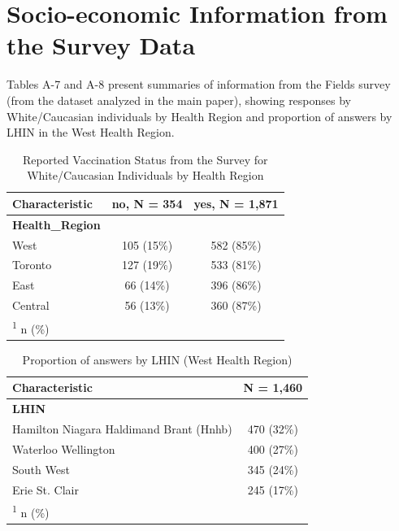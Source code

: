 \documentclass[
  letterpaper,
  DIV=11,
  numbers=noendperiod]{scrartcl}
\begin{document}
\hypertarget{socio-economic-information-from-the-survey-data}{%
\section{Socio-economic Information from the Survey
Data}\label{socio-economic-information-from-the-survey-data}}

Tables A-7 and A-8 present summaries of information from the Fields
survey (from the dataset analyzed in the main paper), showing responses
by White/Caucasian individuals by Health Region and proportion of
answers by LHIN in the West Health Region.

\hypertarget{tbl-hr-percentages}{}
\begin{table}
\caption{\label{tbl-hr-percentages}Reported Vaccination Status from the Survey for White/Caucasian
Individuals by Health Region }\tabularnewline

\centering
\begin{tabular}{lcc}
\toprule
\textbf{Characteristic} & \textbf{no}, N = 354 & \textbf{yes}, N = 1,871\\
\midrule
\textbf{Health\_Region} &  & \\
\hspace{1em}West & 105 (15\%) & 582 (85\%)\\
\hspace{1em}Toronto & 127 (19\%) & 533 (81\%)\\
\hspace{1em}East & 66 (14\%) & 396 (86\%)\\
\hspace{1em}Central & 56 (13\%) & 360 (87\%)\\
\bottomrule
\multicolumn{3}{l}{\rule{0pt}{1em}\textsuperscript{1} n (\%)}\\
\end{tabular}
\end{table}

\hypertarget{tbl-west-hr-lhin}{}
\begin{table}
\caption{\label{tbl-west-hr-lhin}Proportion of answers by LHIN (West Health Region) }\tabularnewline

\centering
\begin{tabular}{lc}
\toprule
\textbf{Characteristic} & \textbf{N = 1,460}\\
\midrule
\textbf{LHIN} & \\
\hspace{1em}Hamilton Niagara Haldimand Brant (Hnhb) & 470 (32\%)\\
\hspace{1em}Waterloo Wellington & 400 (27\%)\\
\hspace{1em}South West & 345 (24\%)\\
\hspace{1em}Erie St. Clair & 245 (17\%)\\
\bottomrule
\multicolumn{2}{l}{\rule{0pt}{1em}\textsuperscript{1} n (\%)}\\
\end{tabular}
\end{table}
\end{document}
